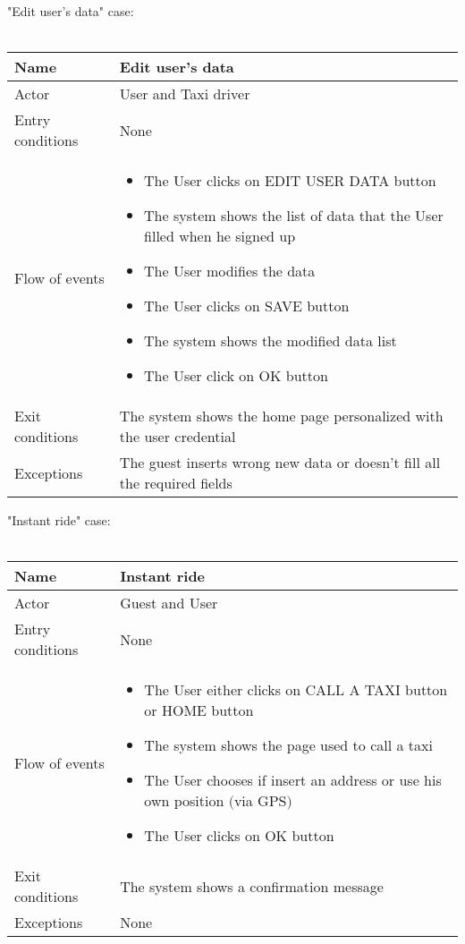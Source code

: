 \newpage
"Edit user's data" case:
\\
\\
\begin{tabular}{|p{3cm}|p{10cm}|}
\hline
Name & Edit user's data\\
\hline
Actor & User and Taxi driver\\
\hline
Entry conditions & None\\
\hline
Flow of events &
	\begin{itemize}
		\item The User clicks on EDIT USER DATA button
		\item The system shows the list of data that the User filled when he signed up
		\item The User modifies the data
		\item The User clicks on SAVE button
		\item The system shows the modified data list
		\item The User click on OK button
	\end{itemize}	\\
\hline
Exit conditions & The system shows the home page personalized with the user credential\\
\hline
Exceptions & The guest inserts wrong new data or doesn't fill all the required fields\\
\hline
\end {tabular}


\newpage
"Instant ride" case:
\\
\\
\begin{tabular}{|p{3cm}|p{10cm}|}
\hline
Name & Instant ride\\
\hline
Actor & Guest and User\\
\hline
Entry conditions & None\\
\hline
Flow of events &
	\begin{itemize}
		\item The User either clicks on CALL A TAXI button or HOME button
		\item The system shows the page used to call a taxi
		\item The User chooses if insert an address or use his own position $($via GPS$)$
		\item The User clicks on OK button
	\end{itemize}\\
\hline
Exit conditions & The system shows a confirmation message\\
\hline
Exceptions & None\\
\hline
\end {tabular}


